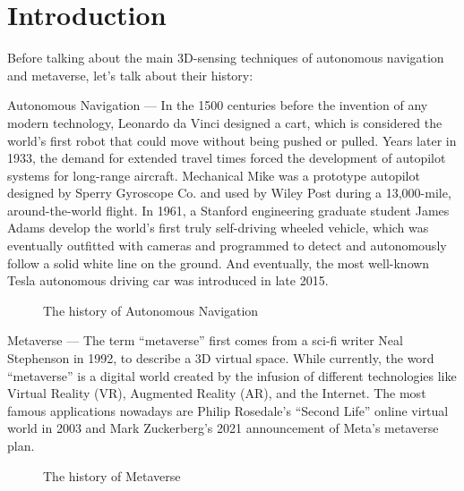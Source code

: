 \section{Introduction}
Before talking about the main 3D-sensing techniques of autonomous navigation and metaverse, let’s talk about their history:

Autonomous Navigation \cite{autonomousHistory} — In the 1500 centuries before the invention of any modern technology, Leonardo da Vinci designed a cart, which is considered the world’s first robot that could move without being pushed or pulled. Years later in 1933, the demand for extended travel times forced the development of autopilot systems for long-range aircraft. Mechanical Mike was a prototype autopilot designed by Sperry Gyroscope Co. and used by Wiley Post during a 13,000-mile, around-the-world flight. In 1961, a Stanford engineering graduate student James Adams develop the world’s first truly self-driving wheeled vehicle, which was eventually outfitted with cameras and programmed to detect and autonomously follow a solid white line on the ground. And eventually, the most well-known Tesla autonomous driving car was introduced in late 2015.

\begin{figure}[H]
    \centering
    \caption[Short text]{The history of Autonomous Navigation \cite{autonomousHistory}}
    \label{fig:autoHis}
\end{figure}

Metaverse \cite{metaverseHistory} — The term “metaverse” first comes from a sci-fi writer Neal Stephenson in 1992, to describe a 3D virtual space. While currently, the word “metaverse” is a digital world created by the infusion of different technologies like Virtual Reality (VR), Augmented Reality (AR), and the Internet. The most famous applications nowadays are Philip Rosedale's “Second Life” online virtual world in 2003 and Mark Zuckerberg's 2021 announcement of Meta's metaverse plan.

\begin{figure}[H]
    \centering
    \caption[Short text]{The history of Metaverse \cite{metaverseHistory}}
    \label{fig:metaverseHis}
\end{figure}